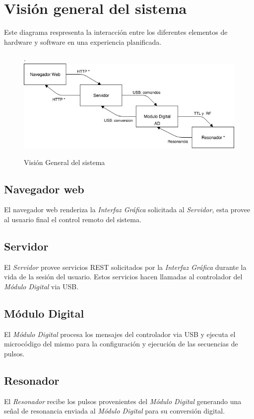 \section{Visi\'on general del sistema}

Este diagrama respresenta la interacci\'on entre los diferentes elementos de hardware 
y software en una experiencia planificada.

\begin{figure}[!htb].
    \includegraphics[width=\linewidth]{../figures/d5.jpg}
    \caption{Visi\'on General del sistema}
    \label{fig:d5}
\end{figure}

\subsection{Navegador web}
El navegador web renderiza la \textit{Interfaz Gr\'afica} solicitada al \textit{Servidor}, esta provee al usuario final 
el control remoto del sistema.

\subsection{Servidor}
El \textit{Servidor} provee servicios REST solicitados por la \textit{Interfaz Gr\'afica} durante la vida
de la sesi\'on del usuario. Estos servicios hacen llamadas al controlador del \textit{M\'odulo
Digital} via USB.

\subsection{M\'odulo Digital}
El \textit{M\'odulo Digital} procesa los mensajes del controlador via USB y ejecuta 
el microc\'odigo del mismo para la configuraci\'on y ejecuci\'on de las secuencias de pulsos.

\subsection{Resonador}
El \textit{Resonador} recibe los pulsos provenientes del \textit{M\'odulo Digital} generando una se\~nal de resonancia
enviada al \textit{M\'odulo Digital} para su conversi\'on digital.

\newpage